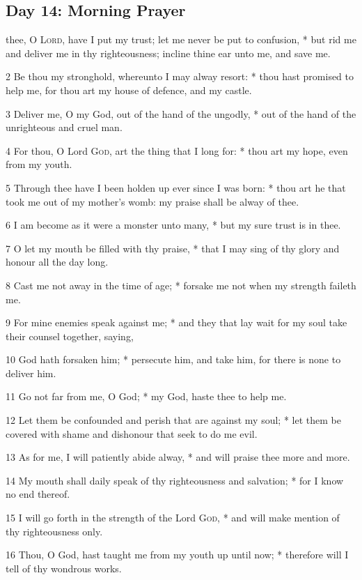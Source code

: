 \subsection{Day 14: Morning Prayer}
 thee, O {\textsc{Lord}}, have I put my trust; let me never be put to confusion, * but rid me and deliver me in thy righteousness; incline thine ear unto me, and save me.\par
2 Be thou my stronghold, whereunto I may alway resort: * thou hast promised to help me, for thou art my house of defence, and my castle.\par
3 Deliver me, O my God, out of the hand of the ungodly, * out of the hand of the unrighteous and cruel man.\par
4 For thou, O Lord \textsc{God}, art the thing that I long for: * thou art my hope, even from my youth.\par
5 Through thee have I been holden up ever since I was born: * thou art he that took me out of my mother's womb: my praise shall be alway of thee.\par
6 I am become as it were a monster unto many, * but my sure trust is in thee.\par
7 O let my mouth be filled with thy praise, * that I may sing of thy glory and honour all the day long.\par
8 Cast me not away in the time of age; * forsake me not when my strength faileth me.\par
9 For mine enemies speak against me; * and they that lay wait for my soul take their counsel together, saying,\par
10 God hath forsaken him; * persecute him, and take him, for there is none to deliver him.\par
11 Go not far from me, O God; * my God, haste thee to help me.\par
12 Let them be confounded and perish that are against my soul; * let them be covered with shame and dishonour that seek to do me evil.\par
13 As for me, I will patiently abide alway, * and will praise thee more and more.\par
14 My mouth shall daily speak of thy righteousness and salvation; * for I know no end thereof.\par
15 I will go forth in the strength of the Lord \textsc{God}, * and will make mention of thy righteousness only.\par
16 Thou, O God, hast taught me from my youth up until now; * therefore will I tell of thy wondrous works.\par
